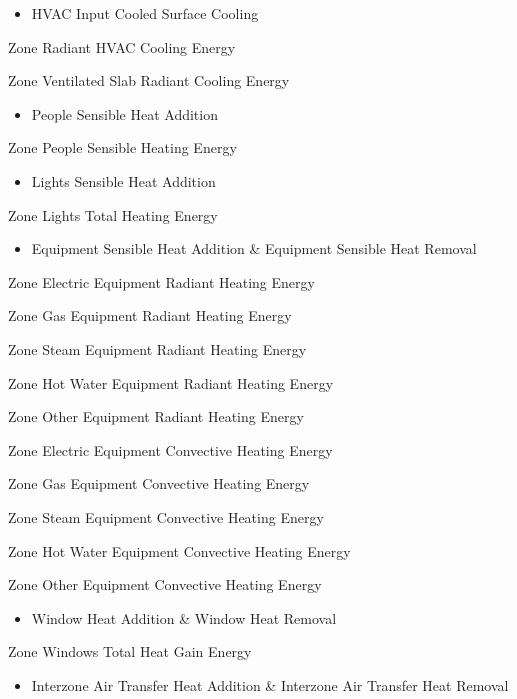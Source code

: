 \begin{itemize}
\tightlist
\item
  HVAC Input Cooled Surface Cooling
\end{itemize}

Zone Radiant HVAC Cooling Energy

Zone Ventilated Slab Radiant Cooling Energy

\begin{itemize}
\tightlist
\item
  People Sensible Heat Addition
\end{itemize}

Zone People Sensible Heating Energy

\begin{itemize}
\tightlist
\item
  Lights Sensible Heat Addition
\end{itemize}

Zone Lights Total Heating Energy

\begin{itemize}
\tightlist
\item
  Equipment Sensible Heat Addition \& Equipment Sensible Heat Removal
\end{itemize}

Zone Electric Equipment Radiant Heating Energy

Zone Gas Equipment Radiant Heating Energy

Zone Steam Equipment Radiant Heating Energy

Zone Hot Water Equipment Radiant Heating Energy

Zone Other Equipment Radiant Heating Energy

Zone Electric Equipment Convective Heating Energy

Zone Gas Equipment Convective Heating Energy

Zone Steam Equipment Convective Heating Energy

Zone Hot Water Equipment Convective Heating Energy

Zone Other Equipment Convective Heating Energy

\begin{itemize}
\tightlist
\item
  Window Heat Addition \& Window Heat Removal
\end{itemize}

Zone Windows Total Heat Gain Energy

\begin{itemize}
\tightlist
\item
  Interzone Air Transfer Heat Addition \& Interzone Air Transfer Heat Removal
\end{itemize}


